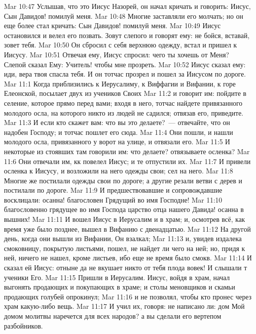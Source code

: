 \vs Mar 10:47 Услышав, что это Иисус Назорей, он начал кричать и говорить: Иисус, Сын Давидов! помилуй меня.
\vs Mar 10:48 Многие заставляли его молчать; но он еще более стал кричать: Сын Давидов! помилуй меня.
\vs Mar 10:49 Иисус остановился и велел его позвать. Зовут слепого и говорят ему: не бойся, вставай, зовет тебя.
\vs Mar 10:50 Он сбросил с себя верхнюю одежду, встал и пришел к Иисусу.
\vs Mar 10:51 Отвечая ему, Иисус спросил: чего ты хочешь от Меня? Слепой сказал Ему: Учитель! чтобы мне прозреть.
\vs Mar 10:52 Иисус сказал ему: иди, вера твоя спасла тебя. И он тотчас прозрел и пошел за Иисусом по дороге.
\vs Mar 11:1 Когда приблизились к Иерусалиму, к Виффагии и Вифании, к горе Елеонской,  посылает двух из учеников Своих
\vs Mar 11:2 и говорит им: пойдите в селение, которое прямо перед вами; входя в него, тотчас найдете привязанного молодого осла, на которого никто из людей не садился; отвязав его, приведите.
\vs Mar 11:3 И если кто скажет вам: что вы это делаете?~--- отвечайте, что он надобен Господу; и тотчас пошлет его сюда.
\vs Mar 11:4 Они пошли, и нашли молодого осла, привязанного у ворот на улице, и отвязали его.
\vs Mar 11:5 И некоторые из стоявших там говорили им: что делаете?  отвязываете осленка?
\vs Mar 11:6 Они отвечали им, кк повелел Иисус; и те отпустили их.
\vs Mar 11:7 И привели осленка к Иисусу, и возложили на него одежды свои;  сел на него.
\vs Mar 11:8 Многие же постилали одежды свои по дороге; а другие резали ветви с дерев и постилали по дороге.
\vs Mar 11:9 И предшествовавшие и сопровождавшие восклицали: осанна! благословен Грядущий во имя Господне!
\vs Mar 11:10 благословенно грядущее во имя Господа царство отца нашего Давида! осанна в вышних!
\rsbpar\vs Mar 11:11 И вошел Иисус в Иерусалим и в храм; и, осмотрев всё, как время уже было позднее, вышел в Вифанию с двенадцатью.
\rsbpar\vs Mar 11:12 На другой день, когда они вышли из Вифании, Он взалкал;
\vs Mar 11:13 и, увидев издалека смоковницу, покрытую листьями, пошел, не найдет ли чего на ней; но, придя к ней, ничего не нашел, кроме листьев, ибо еще не время было  смокв.
\vs Mar 11:14 И сказал ей Иисус: отныне да не вкушает никто от тебя плода вовек! И слышали т ученики Его.
\vs Mar 11:15 Пришли в Иерусалим. Иисус, войдя в храм, начал выгонять продающих и покупающих в храме; и столы меновщиков и скамьи продающих голубей опрокинул;
\vs Mar 11:16 и не позволял, чтобы кто пронес через храм какую-либо вещь.
\vs Mar 11:17 И учил их, говоря: не написано ли: дом Мой домом молитвы наречется для всех народов? а вы сделали его вертепом разбойников.
